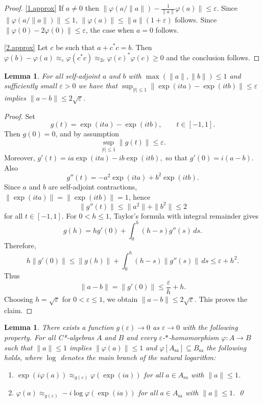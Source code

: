 \documentclass[11pt]{amsproc}
\newcommand{\cstar}{C*}
\theoremstyle{definition}
\theoremstyle{plain}
\newtheorem{lemma}[definition]{Lemma}
\theoremstyle{remark}
\begin{document}
\begin{proof} \eqref{1.approx} If $a\neq 0$ then 
	$\|\varphi(a/\|a\|)-\frac 1{\|a\|} \varphi(a)\|\leq \varepsilon$. Since $\|\varphi(a/\|a\|)\|\leq 1$, $\|\varphi(a)\|\leq \|a\| (1+\varepsilon)$ follows. Since 
	$\|\varphi(0)-2\varphi(0)\|\leq \varepsilon$, the case when $a=0$ follows. 
	
	\eqref{2.approx} Let $c$ be such that $a+c^*c=b$. Then $\varphi(b)-\varphi(a)\approx_\varepsilon \varphi(c^*c)\approx_{2\varepsilon}\varphi(c)^*\varphi(c)\geq 0$ and the conclusion follows. 
	\end{proof}


\begin{lemma}
	\label{L.exp} For all self-adjoint $a$ and $b$ with $\max(\|a\|,\|b\|)\leq 1$  and sufficiently small $\varepsilon>0$ we have that $\sup_{|t|\leq 1} \|\exp(ita)-\exp(itb)\|\leq \varepsilon$ implies $\|a-b\|\leq 2\sqrt \varepsilon$.  \end{lemma}
\begin{proof}
	Set
	\[
	g(t)=\exp(ita)-\exp(itb), \qquad t\in[-1,1].
	\]
	Then \(g(0)=0\), and by assumption
	\[
	\sup_{|t|\leq 1}\|g(t)\|\leq \varepsilon .
	\]
	Moreover,
	$
	g'(t)=ia\exp(ita)-ib\exp(itb),
	$
	so that
	$
	g'(0)=i(a-b).
	$
	Also
	\[
	g''(t)=-a^2\exp(ita)+b^2\exp(itb).
	\]
	Since \(a\) and \(b\) are self-adjoint contractions, \(\|\exp(ita)\|=\|\exp(itb)\|=1\), hence
	\[
	\|g''(t)\|\leq \|a^2\|+\|b^2\|\leq 2
	\]
	for all \(t\in[-1,1]\).
	For \(0<h\leq 1\), Taylor's formula with integral remainder gives
	\[
	g(h)=h g'(0)+\int_0^h (h-s)g''(s)\,ds.
	\]
	Therefore, 
	\[
	h\|g'(0)\|
	\leq \|g(h)\|+\int_0^h (h-s)\|g''(s)\|\,ds
	\leq \varepsilon+h^2.
	\]
	Thus
	\[
	\|a-b\|=\|g'(0)\|\leq \frac{\varepsilon}{h}+h.
	\]
	Choosing \(h=\sqrt{\varepsilon}\) for \(0<\varepsilon\leq 1\), we obtain
	$
	\|a-b\|\leq 2\sqrt{\varepsilon}.
	$
	This proves the claim.
\end{proof}



\begin{lemma}\label{L.g}
	There exists a function $g(\varepsilon)\to 0$ as $\varepsilon\to 0$ with the following property. For all \cstar-algebras $A$ and $B$ and every $\varepsilon$-$*$-homomorphism $\varphi\colon A\to B$ such that $\|a\|\leq 1$ implies $\|\varphi(a)\|\leq 1$ and $\varphi[A_{\textrm{sa}}]\subseteq B_{\textrm{sa}}$ the following 
	holds, where $\log$ denotes the main branch of the natural logarithm:
	\begin{enumerate}
		\item \label{I.exp} $\exp(i\varphi(a))\approx_{g(\varepsilon )}\varphi(\exp(i a))$ for all $a\in A_{\textrm{sa}}$ with $\|a\|\leq 1$. 
		\item $\varphi(a)\approx_{g(\varepsilon)} -i \log \varphi(\exp(ia))$ for all $a\in A_{\textrm{sa}}$ with $\|a\|\leq 1$. \qed 
	\end{enumerate}
\end{lemma}
\end{document}
